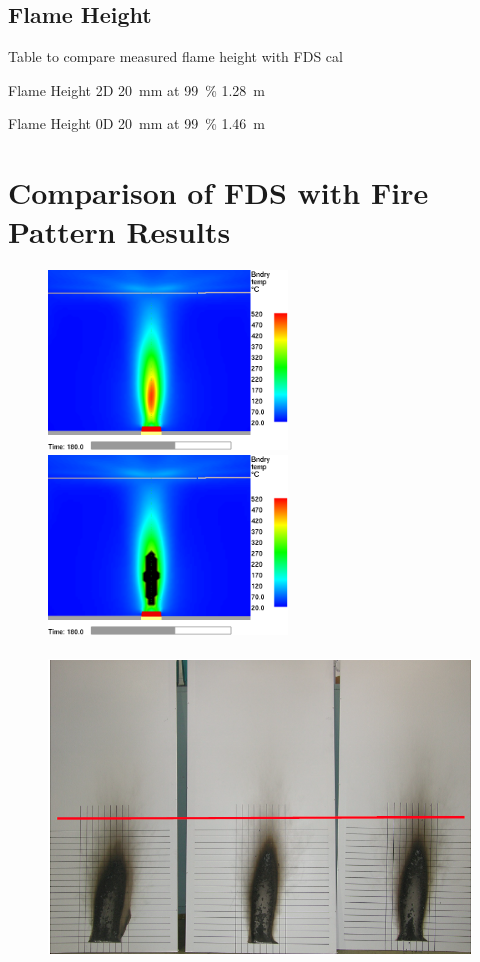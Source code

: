 \documentclass[twoside]{uocthesis}
\begin{document}
{\subsection{Flame Height}

Table to compare measured flame height with FDS cal~\cite{McDermott:2011}



Flame Height 2D  20~mm  at 99~\%  1.28~m

Flame Height 0D  20~mm  at 99~\%  1.46~m




\section{Comparison of FDS with Fire Pattern Results}

\begin{figure}[h]
  \centering
  \includegraphics[width=2.5in]{../Figures/WallTemp_10mm_0D_0_8m_guideline}
  \includegraphics[width=2.5in]{../Figures/350CThresholdwall_temp_0_8m_guideline}\\
  \hspace{4 mm}  \\ 
  \includegraphics[width=.625\columnwidth]{../Figures/GBNGreps_w_1m_guideline}\\

\end{figure}}
\end{document}
